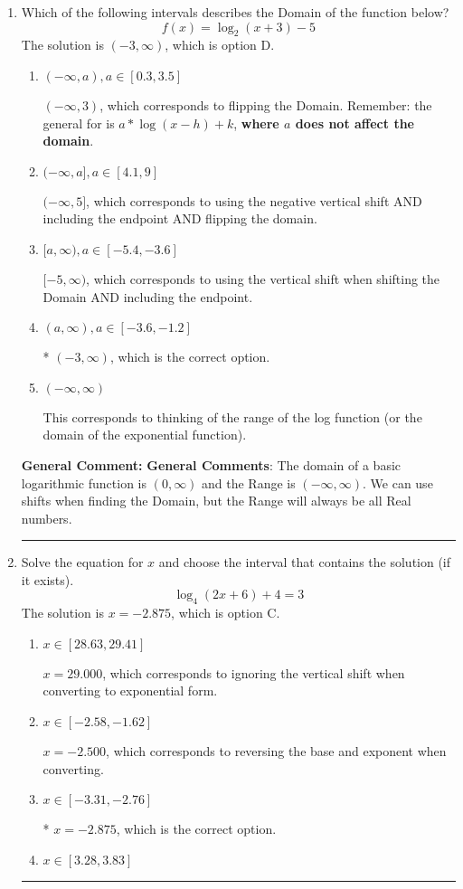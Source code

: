 \documentclass{extbook}[14pt]
\newcommand{\litem}[1]{\item #1

\rule{\textwidth}{0.4pt}}
\begin{document}
\begin{enumerate}\litem{
Which of the following intervals describes the Domain of the function below?
\[ f(x) = \log_2{(x+3)}-5 \]The solution is \( (-3, \infty) \), which is option D.\begin{enumerate}[label=\Alph*.]
\item \( (-\infty, a), a \in [0.3, 3.5] \)

$(-\infty, 3)$, which corresponds to flipping the Domain. Remember: the general for is $a*\log(x-h)+k$, \textbf{where $a$ does not affect the domain}.
\item \( (-\infty, a], a \in [4.1, 9] \)

$(-\infty, 5]$, which corresponds to using the negative vertical shift AND including the endpoint AND flipping the domain.
\item \( [a, \infty), a \in [-5.4, -3.6] \)

$[-5, \infty)$, which corresponds to using the vertical shift when shifting the Domain AND including the endpoint.
\item \( (a, \infty), a \in [-3.6, -1.2] \)

* $(-3, \infty)$, which is the correct option.
\item \( (-\infty, \infty) \)

This corresponds to thinking of the range of the log function (or the domain of the exponential function).
\end{enumerate}

\textbf{General Comment:} \textbf{General Comments}: The domain of a basic logarithmic function is $(0, \infty)$ and the Range is $(-\infty, \infty)$. We can use shifts when finding the Domain, but the Range will always be all Real numbers.
}
\litem{
Solve the equation for $x$ and choose the interval that contains the solution (if it exists).
\[ \log_{4}{(2x+6)}+4 = 3 \]The solution is \( x = -2.875 \), which is option C.\begin{enumerate}[label=\Alph*.]
\item \( x \in [28.63, 29.41] \)

$x = 29.000$, which corresponds to ignoring the vertical shift when converting to exponential form.
\item \( x \in [-2.58, -1.62] \)

$x = -2.500$, which corresponds to reversing the base and exponent when converting.
\item \( x \in [-3.31, -2.76] \)

* $x = -2.875$, which is the correct option.
\item \( x \in [3.28, 3.83] \)


\end{enumerate}}
\end{enumerate}
\end{document}
